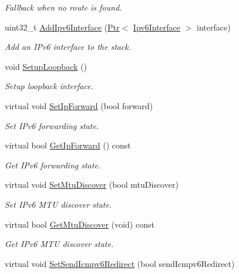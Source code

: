 \begin{DoxyCompactItemize}
\begin{DoxyCompactList}\small\item\em Fallback when no route is found. \end{DoxyCompactList}\item 
uint32\+\_\+t \hyperlink{classns3_1_1Ipv6L3Protocol_aa0c786fd0209504c82b7278297a62f99}{Add\+Ipv6\+Interface} (\hyperlink{classns3_1_1Ptr}{Ptr}$<$ \hyperlink{classns3_1_1Ipv6Interface}{Ipv6\+Interface} $>$ interface)
\begin{DoxyCompactList}\small\item\em Add an I\+Pv6 interface to the stack. \end{DoxyCompactList}\item 
void \hyperlink{classns3_1_1Ipv6L3Protocol_a69a1ef7b49dd3aa80c6807f467720005}{Setup\+Loopback} ()
\begin{DoxyCompactList}\small\item\em Setup loopback interface. \end{DoxyCompactList}\item 
virtual void \hyperlink{classns3_1_1Ipv6L3Protocol_af305cd631f4f5b4acaf75f3d4243c08b}{Set\+Ip\+Forward} (bool forward)
\begin{DoxyCompactList}\small\item\em Set I\+Pv6 forwarding state. \end{DoxyCompactList}\item 
virtual bool \hyperlink{classns3_1_1Ipv6L3Protocol_a5ea6340dc5eef31896c71201dd789d49}{Get\+Ip\+Forward} () const 
\begin{DoxyCompactList}\small\item\em Get I\+Pv6 forwarding state. \end{DoxyCompactList}\item 
virtual void \hyperlink{classns3_1_1Ipv6L3Protocol_a9954be60f9cfc8b7570a18eb0b8b92f9}{Set\+Mtu\+Discover} (bool mtu\+Discover)
\begin{DoxyCompactList}\small\item\em Set I\+Pv6 M\+TU discover state. \end{DoxyCompactList}\item 
virtual bool \hyperlink{classns3_1_1Ipv6L3Protocol_a3214a558eb2b6549243f39eb821bd543}{Get\+Mtu\+Discover} (void) const 
\begin{DoxyCompactList}\small\item\em Get I\+Pv6 M\+TU discover state. \end{DoxyCompactList}\item 
virtual void \hyperlink{classns3_1_1Ipv6L3Protocol_aa5c6bd6e857b631c812ed5bbe4566241}{Set\+Send\+Icmpv6\+Redirect} (bool send\+Icmpv6\+Redirect)

\end{DoxyCompactItemize}
